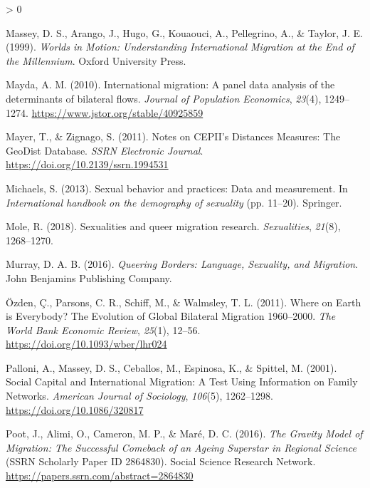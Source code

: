 \documentclass[
  11pt,
]{article}
\newlength{\cslhangindent}
\newenvironment{CSLReferences}[2] %
 {%
  \setlength{\parindent}{0pt}
  \ifodd #1 \everypar{\setlength{\hangindent}{\cslhangindent}}\ignorespaces\fi
  \ifnum #2 > 0
  \setlength{\parskip}{#2\baselineskip}
  \fi
 }%
 {}
\begin{document}
\begin{CSLReferences}{1}{0}
\leavevmode\hypertarget{ref-massey_1999}{}%
Massey, D. S., Arango, J., Hugo, G., Kouaouci, A., Pellegrino, A., \& Taylor, J. E. (1999). \emph{Worlds in {Motion}: {Understanding} {International} {Migration} at the {End} of the {Millennium}}. Oxford University Press.

\leavevmode\hypertarget{ref-mayda_2010}{}%
Mayda, A. M. (2010). International migration: A panel data analysis of the determinants of bilateral flows. \emph{Journal of Population Economics}, \emph{23}(4), 1249--1274. \url{https://www.jstor.org/stable/40925859}

\leavevmode\hypertarget{ref-mayer_2011}{}%
Mayer, T., \& Zignago, S. (2011). Notes on {CEPII}'s {Distances} {Measures}: {The} {GeoDist} {Database}. \emph{SSRN Electronic Journal}. \url{https://doi.org/10.2139/ssrn.1994531}

\leavevmode\hypertarget{ref-michaels_2013}{}%
Michaels, S. (2013). Sexual behavior and practices: {Data} and measurement. In \emph{International handbook on the demography of sexuality} (pp. 11--20). Springer.

\leavevmode\hypertarget{ref-mole_2018a}{}%
Mole, R. (2018). Sexualities and queer migration research. \emph{Sexualities}, \emph{21}(8), 1268--1270.

\leavevmode\hypertarget{ref-murray_2016}{}%
Murray, D. A. B. (2016). \emph{Queering {Borders}: {Language}, {Sexuality}, and {Migration}}. John Benjamins Publishing Company.

\leavevmode\hypertarget{ref-ozden_2011}{}%
Özden, Ç., Parsons, C. R., Schiff, M., \& Walmsley, T. L. (2011). Where on {Earth} is {Everybody}? {The} {Evolution} of {Global} {Bilateral} {Migration} 1960--2000. \emph{The World Bank Economic Review}, \emph{25}(1), 12--56. \url{https://doi.org/10.1093/wber/lhr024}

\leavevmode\hypertarget{ref-palloni_2001}{}%
Palloni, A., Massey, D. S., Ceballos, M., Espinosa, K., \& Spittel, M. (2001). Social {Capital} and {International} {Migration}: {A} {Test} {Using} {Information} on {Family} {Networks}. \emph{American Journal of Sociology}, \emph{106}(5), 1262--1298. \url{https://doi.org/10.1086/320817}

\leavevmode\hypertarget{ref-poot_2016}{}%
Poot, J., Alimi, O., Cameron, M. P., \& Maré, D. C. (2016). \emph{The {Gravity} {Model} of {Migration}: {The} {Successful} {Comeback} of an {Ageing} {Superstar} in {Regional} {Science}} (SSRN Scholarly Paper ID 2864830). Social Science Research Network. \url{https://papers.ssrn.com/abstract=2864830}


\end{CSLReferences}
\end{document}
